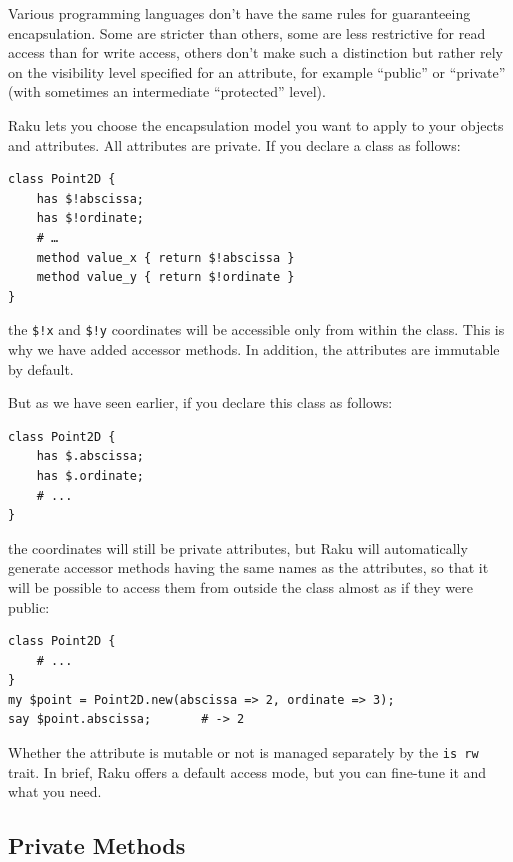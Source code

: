 Various programming languages don't have the same rules for 
guaranteeing encapsulation. Some are stricter than others, 
some are less restrictive for read access than for write access, 
others don't make such a distinction but rather rely on the 
visibility level specified for an attribute, for example 
``public'' or ``private'' (with sometimes an intermediate 
``protected'' level).

Raku lets you choose the encapsulation model you want to 
apply to your objects and attributes. All attributes are 
private. If you declare a class as follows:

\begin{verbatim}
class Point2D {
    has $!abscissa;
    has $!ordinate;
    # …
    method value_x { return $!abscissa }
    method value_y { return $!ordinate }
}
\end{verbatim}

the \verb'$!x' and \verb'$!y' coordinates will be 
accessible only from within the class. This is why 
we have added accessor methods. In addition, the 
attributes are immutable by default.

But as we have seen earlier, if you declare this class 
as follows:

\begin{verbatim}
class Point2D {
    has $.abscissa;
    has $.ordinate;
    # ...
}
\end{verbatim}

the coordinates will still be private attributes, but Raku 
will automatically generate accessor methods having the same 
names as the attributes, so that it will be possible to access 
them from outside the class almost as if they were public:

\begin{verbatim}
class Point2D {
    # ...
}
my $point = Point2D.new(abscissa => 2, ordinate => 3);
say $point.abscissa;       # -> 2
\end{verbatim}

Whether the attribute is mutable or not is managed separately 
by the {\tt is rw} trait. In brief, Raku offers a default 
access mode, but you can fine-tune it and what you need.


\subsection{Private Methods}

